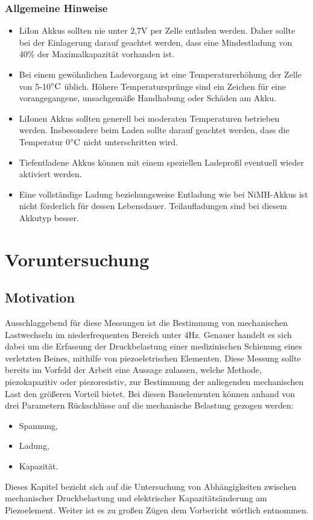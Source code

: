 \documentclass[12pt]{scrreprt} %
\begin{document}
\subsection{Allgemeine Hinweise}
\begin{itemize}
\item
LiIon Akkus sollten nie unter 2,7V per Zelle entladen werden. Daher sollte bei der Einlagerung darauf geachtet werden, dass eine Mindestladung von 40\% der Maximalkapazität vorhanden ist.
\item
Bei einem gewöhnlichen Ladevorgang ist eine Temperaturerhöhung der Zelle von 5-10$\celsius$ üblich. Höhere Temperatursprünge sind ein Zeichen für eine vorangegangene, unsachgemäße Handhabung oder Schäden am Akku. 
\item
LiIonen Akkus sollten generell bei moderaten Temperaturen betrieben werden. Insbesondere beim Laden sollte darauf geachtet werden, dass die Temperatur 0$\celsius$ nicht unterschritten wird.
\item
Tiefentladene Akkus können mit einem speziellen Ladeprofil eventuell wieder aktiviert werden.
\item
Eine vollständige Ladung beziehungsweise Entladung wie bei NiMH-Akkus ist nicht förderlich für dessen Lebensdauer. Teilaufladungen sind bei diesem Akkutyp besser.
\end{itemize}
\chapter{Voruntersuchung}

\section{Motivation}
Ausschlaggebend für diese Messungen ist die Bestimmung von mechanischen Lastwechseln im niederfrequenten Bereich unter 4Hz. Genauer handelt es sich dabei um die Erfassung der Druckbelastung einer medizinischen Schienung eines verletzten Beines, mithilfe von piezoeletrischen Elementen. Diese Messung sollte bereits im Vorfeld der Arbeit eine Aussage zulassen, welche Methode, piezokapazitiv oder piezoresistiv, zur Bestimmung der anliegenden mechanischen Last den größeren Vorteil bietet. Bei diesen Bauelementen können anhand von drei Parametern Rückschlüsse auf die mechanische Belastung gezogen werden:
\begin{itemize}
\item Spannung,
\item Ladung,
\item Kapazität.
\end{itemize}
Dieses Kapitel bezieht sich auf die Untersuchung von Abhängigkeiten zwischen mechanischer Druckbelastung und elektrischer Kapazitätsänderung am Piezoelement. Weiter ist es zu großen Zügen dem Vorbericht \citep{Jobstmann2012} wörtlich entnommen.
\end{document}
